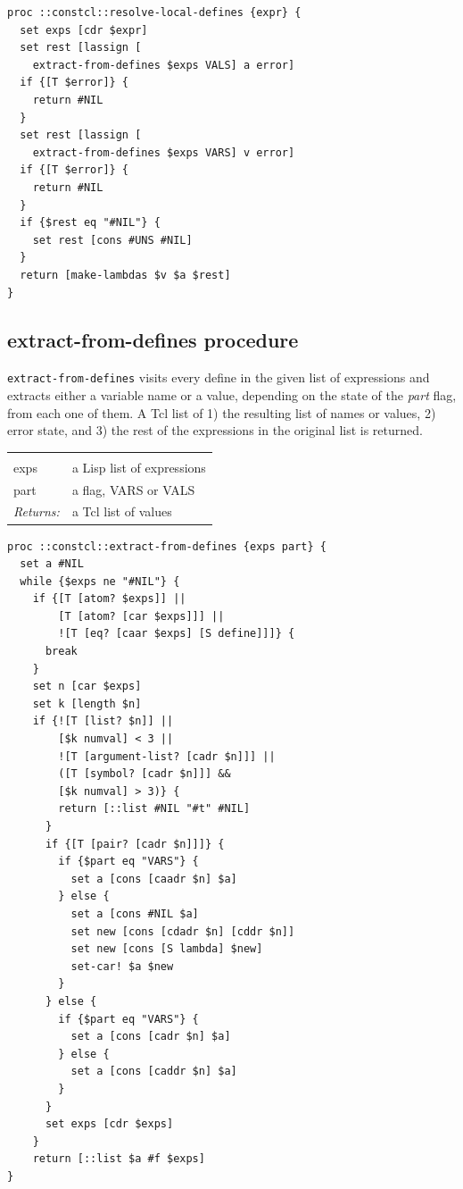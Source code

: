 \documentclass[twoside]{report}
\begin{document}
\begin{lstlisting}
proc ::constcl::resolve-local-defines {expr} {
  set exps [cdr $expr]
  set rest [lassign [
    extract-from-defines $exps VALS] a error]
  if {[T $error]} {
    return #NIL
  }
  set rest [lassign [
    extract-from-defines $exps VARS] v error]
  if {[T $error]} {
    return #NIL
  }
  if {$rest eq "#NIL"} {
    set rest [cons #UNS #NIL]
  }
  return [make-lambdas $v $a $rest]
}
\end{lstlisting}

\subsection{extract-from-defines procedure}
\label{extractfromdefines-procedure}

\texttt{extract-from-defines} visits every define in the given list of expressions and extracts either a variable name or a value, depending on the state of the \emph{part} flag, from each one of them. A Tcl list of 1) the resulting list of names or values, 2) error state, and 3) the rest of the expressions in the original list is returned.

\noindent\begin{tabular}{ |p{1.9cm} p{8cm}| }
\hline
\rowcolor[HTML]{CCCCCC} \multicolumn{2}{|l|}{\bf extract-from-defines (internal)} \\
exps & a Lisp list of expressions \\
part & a flag, VARS or VALS \\
\textit{Returns:} & a Tcl list of values \\
\hline
\end{tabular}

\begin{lstlisting}
proc ::constcl::extract-from-defines {exps part} {
  set a #NIL
  while {$exps ne "#NIL"} {
    if {[T [atom? $exps]] ||
        [T [atom? [car $exps]]] ||
        ![T [eq? [caar $exps] [S define]]]} {
      break
    }
    set n [car $exps]
    set k [length $n]
    if {![T [list? $n]] ||
        [$k numval] < 3 ||
        ![T [argument-list? [cadr $n]]] ||
        ([T [symbol? [cadr $n]]] &&
        [$k numval] > 3)} {
        return [::list #NIL "#t" #NIL]
      }
      if {[T [pair? [cadr $n]]]} {
        if {$part eq "VARS"} {
          set a [cons [caadr $n] $a]
        } else {
          set a [cons #NIL $a]
          set new [cons [cdadr $n] [cddr $n]]
          set new [cons [S lambda] $new]
          set-car! $a $new
        }
      } else {
        if {$part eq "VARS"} {
          set a [cons [cadr $n] $a]
        } else {
          set a [cons [caddr $n] $a]
        }
      }
      set exps [cdr $exps]
    }
    return [::list $a #f $exps]
}
\end{lstlisting}
\end{document}
